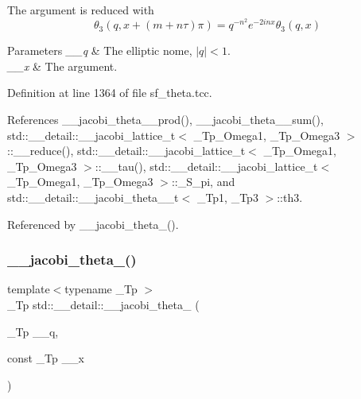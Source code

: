 The argument is reduced with \[ \theta_3(q, x + (m+n\tau)\pi) = q^{-n^2} e^{-2inx} \theta_3(q, x) \]


\begin{DoxyParams}{Parameters}
{\em \+\_\+\+\_\+q} & The elliptic nome, $ |q| < 1 $. \\
\hline
{\em \+\_\+\+\_\+x} & The argument. \\
\hline
\end{DoxyParams}


Definition at line 1364 of file sf\+\_\+theta.\+tcc.



References \+\_\+\+\_\+jacobi\+\_\+theta\+\_\+\_\+prod(), \+\_\+\+\_\+jacobi\+\_\+theta\+\_\+\_\+sum(), std\+::\+\_\+\+\_\+detail\+::\+\_\+\+\_\+jacobi\+\_\+lattice\+\_\+t$<$ \+\_\+\+Tp\+\_\+\+Omega1, \+\_\+\+Tp\+\_\+\+Omega3 $>$\+::\+\_\+\+\_\+reduce(), std\+::\+\_\+\+\_\+detail\+::\+\_\+\+\_\+jacobi\+\_\+lattice\+\_\+t$<$ \+\_\+\+Tp\+\_\+\+Omega1, \+\_\+\+Tp\+\_\+\+Omega3 $>$\+::\+\_\+\+\_\+tau(), std\+::\+\_\+\+\_\+detail\+::\+\_\+\+\_\+jacobi\+\_\+lattice\+\_\+t$<$ \+\_\+\+Tp\+\_\+\+Omega1, \+\_\+\+Tp\+\_\+\+Omega3 $>$\+::\+\_\+\+S\+\_\+pi, and std\+::\+\_\+\+\_\+detail\+::\+\_\+\+\_\+jacobi\+\_\+theta\+\_\+\_\+t$<$ \+\_\+\+Tp1, \+\_\+\+Tp3 $>$\+::th3.



Referenced by \+\_\+\+\_\+jacobi\+\_\+theta\+\_().

\mbox{\label{namespacestd_1_1____detail_a6a7102085368188062ef47100ce80239}} 
\subsubsection{\texorpdfstring{\+\_\+\+\_\+jacobi\+\_\+theta\+\_()}{\_\_jacobi\_theta\_3()}\hspace{0.1cm}{\footnotesize\ttfamily [2/2]}}
{\footnotesize\ttfamily template$<$typename \+\_\+\+Tp $>$ \\
\+\_\+\+Tp std\+::\+\_\+\+\_\+detail\+::\+\_\+\+\_\+jacobi\+\_\+theta\+\_ (\begin{DoxyParamCaption}\item[{\+\_\+\+Tp}]{\+\_\+\+\_\+q,  }\item[{const \+\_\+\+Tp}]{\+\_\+\+\_\+x }\end{DoxyParamCaption})}

